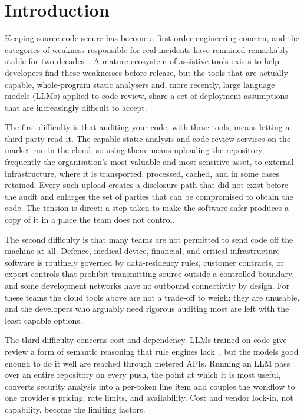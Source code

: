 \section{Introduction}
\label{sec:intro}

Keeping source code secure has become a first-order engineering concern,
and the categories of weakness responsible for real incidents have
remained remarkably stable for two decades~\cite{owasp2021,mitrecwe}. A
mature ecosystem of assistive tools exists to help developers find these
weaknesses before release, but the tools that are actually
capable, whole-program static analysers and, more recently, large
language models (LLMs) applied to code review, share a set of deployment
assumptions that are increasingly difficult to accept.

The first difficulty is that auditing your code, with these tools, means
letting a third party read it. The capable static-analysis and
code-review services on the market run in the cloud, so using them means
uploading the repository, frequently the organisation's most valuable
and most sensitive asset, to external infrastructure, where it is
transported, processed, cached, and in some cases retained. Every such
upload creates a disclosure path that did not exist before the audit and
enlarges the set of parties that can be compromised to obtain the code.
The tension is direct: a step taken to make the software safer produces a
copy of it in a place the team does not control.

The second difficulty is that many teams are not permitted to send code
off the machine at all. Defence, medical-device, financial, and
critical-infrastructure software is routinely governed by data-residency
rules, customer contracts, or export controls that prohibit transmitting
source outside a controlled boundary, and some development networks have
no outbound connectivity by design. For these teams the cloud tools above
are not a trade-off to weigh; they are unusable, and the developers who
arguably need rigorous auditing most are left with the least capable
options.

The third difficulty concerns cost and dependency. LLMs trained on code
give review a form of semantic reasoning that rule engines
lack~\cite{chen2021codex}, but the models good enough to do it well are
reached through metered APIs. Running an LLM pass over an entire
repository on every push, the point at which it is most
useful, converts security analysis into a per-token line item and
couples the workflow to one provider's pricing, rate limits, and
availability. Cost and vendor lock-in, not capability, become the
limiting factors.

